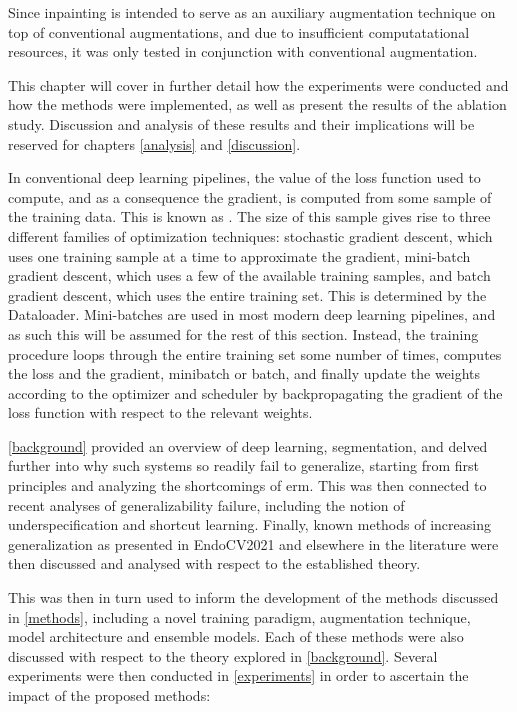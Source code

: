 Since inpainting is intended to serve as an auxiliary augmentation technique on top of conventional augmentations, and due to insufficient computatational resources, it was only tested in conjunction with conventional augmentation.  

This chapter will cover in further detail how the experiments were conducted and how the methods were implemented, as well as present the results of the ablation study. Discussion and analysis of these results and their implications will be reserved for chapters \ref{analysis} and \ref{discussion}. 

          In conventional deep learning pipelines, the value of the loss function used to compute, and as a consequence the gradient, is computed from some sample of the training data. This is known as . The size of this sample gives rise to three different families of optimization techniques: stochastic gradient descent, which uses one training sample at a time to approximate the gradient, mini-batch gradient descent, which uses a few of the available training samples, and batch gradient descent, which uses the entire training set. This is determined by the Dataloader. Mini-batches are used in most modern deep learning pipelines, and as such this will be assumed for the rest of this section.
          Instead, the training procedure loops through the entire training set some number of times, computes the loss and the gradient, minibatch or batch, and finally update the weights according to the optimizer and scheduler by backpropagating the gradient of the loss function with respect to the relevant weights.
          
          
\cref{background} provided an overview of deep learning, segmentation, and delved further into why such systems so readily fail to generalize, starting from first principles and analyzing the shortcomings of \gls{erm}. This was then connected to recent analyses of generalizability failure, including the notion of underspecification and shortcut learning. Finally, known methods of increasing generalization as presented in EndoCV2021 and elsewhere in the literature were then discussed and analysed with respect to the established theory. 

This was then in turn used to inform the development of the methods discussed in \cref{methods}, including a novel training paradigm, augmentation technique, model architecture and ensemble models. Each of these methods were also discussed with respect to the theory explored in \cref{background}.
Several experiments were then conducted in \cref{experiments} in order to ascertain the impact of the proposed methods:

